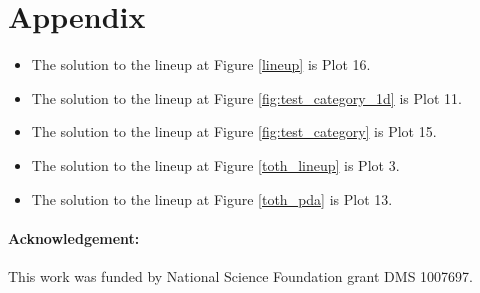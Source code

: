 \documentclass[12]{article}
\begin{document}
\section{Appendix}

\begin{itemize}
\item The solution to the lineup at Figure \ref{lineup} is Plot 16. 
\item The solution to the lineup at Figure \ref{fig:test_category_1d} is Plot 11.
\item The solution to the lineup at Figure \ref{fig:test_category} is Plot 15.
\item The solution to the lineup at Figure \ref{toth_lineup} is Plot 3.
\item The solution to the lineup at Figure \ref{toth_pda} is Plot 13.


\end{itemize}



\paragraph{Acknowledgement:}
%
This work was funded by National Science Foundation grant DMS 1007697.



\end{document}
